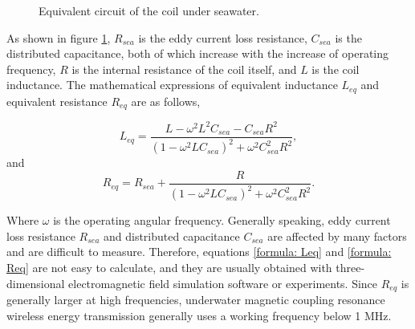 
\begin{figure}[!t]
    \centering
    \caption{Equivalent circuit of the coil under seawater.}
    \label{fig:coil under seawater}
\end{figure}

As shown in figure \ref{fig:coil under seawater}, $R_{sea}$ is the eddy current loss resistance, $C_{sea}$ is the distributed capacitance, both of which increase with the increase of operating frequency, $R$ is the internal resistance of the coil itself, and $L$ is the coil inductance. The mathematical expressions of equivalent inductance $L_{eq}$ and equivalent resistance $R_{eq}$ are as follows,

\begin{equation}
    L_{eq} = \frac{L-\omega ^2 L^2C_{sea}- C_{sea}R^2}{(1-\omega ^2 LC_{sea})^2 + \omega^2C_{sea}^2R^2},
    \label{formula: Leq}
\end{equation}
and
\begin{equation}
    R_{eq} = R_{sea} + \frac{R}{(1-\omega^2LC_{sea})^2+\omega^2C_{sea}^2R^2}.
    \label{formula: Req}
\end{equation}

Where $\omega$ is the operating angular frequency. Generally speaking, eddy current loss resistance $R_{sea}$ and distributed capacitance $C_{sea}$ are affected by many factors and are difficult to measure. Therefore, equations \ref{formula: Leq} and \ref{formula: Req} are not easy to calculate, and they are usually obtained with three-dimensional electromagnetic field simulation software or experiments. Since $R_{eq}$ is generally larger at high frequencies, underwater magnetic coupling resonance wireless energy transmission generally uses a working frequency below 1 MHz.